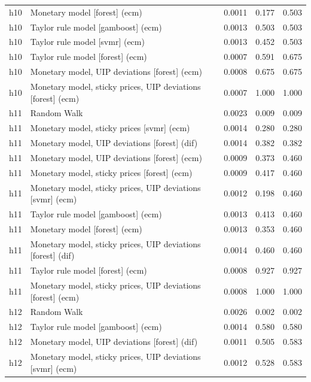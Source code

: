 \begin{ThreePartTable}
\begin{longtable}[t]{cp{5.5cm}ccc}
h10 & \raggedright Monetary model [forest] (ecm) & 0.0011 & 0.177 & 0.503\\
h10 & \raggedright Taylor rule model [gamboost] (ecm) & 0.0013 & 0.503 & 0.503\\
h10 & \raggedright Taylor rule model [svmr] (ecm) & 0.0013 & 0.452 & 0.503\\
h10 & \raggedright Taylor rule model [forest] (ecm) & 0.0007 & 0.591 & 0.675\\
h10 & \raggedright Monetary model, UIP deviations [forest] (ecm) & 0.0008 & 0.675 & 0.675\\
h10 & \raggedright Monetary model, sticky prices, UIP deviations [forest] (ecm) & 0.0007 & 1.000 & 1.000\\
\addlinespace
h11 & \raggedright Random Walk & 0.0023 & 0.009 & 0.009\\
h11 & \raggedright Monetary model, sticky prices [svmr] (ecm) & 0.0014 & 0.280 & 0.280\\
h11 & \raggedright Monetary model, UIP deviations [forest] (dif) & 0.0014 & 0.382 & 0.382\\
h11 & \raggedright Monetary model, UIP deviations [forest] (ecm) & 0.0009 & 0.373 & 0.460\\
h11 & \raggedright Monetary model, sticky prices [forest] (ecm) & 0.0009 & 0.417 & 0.460\\
h11 & \raggedright Monetary model, sticky prices, UIP deviations [svmr] (ecm) & 0.0012 & 0.198 & 0.460\\
h11 & \raggedright Taylor rule model [gamboost] (ecm) & 0.0013 & 0.413 & 0.460\\
h11 & \raggedright Monetary model [forest] (ecm) & 0.0013 & 0.353 & 0.460\\
h11 & \raggedright Monetary model, sticky prices, UIP deviations [forest] (dif) & 0.0014 & 0.460 & 0.460\\
h11 & \raggedright Taylor rule model [forest] (ecm) & 0.0008 & 0.927 & 0.927\\
h11 & \raggedright Monetary model, sticky prices, UIP deviations [forest] (ecm) & 0.0008 & 1.000 & 1.000\\
\addlinespace
h12 & \raggedright Random Walk & 0.0026 & 0.002 & 0.002\\
h12 & \raggedright Taylor rule model [gamboost] (ecm) & 0.0014 & 0.580 & 0.580\\
h12 & \raggedright Monetary model, UIP deviations [forest] (dif) & 0.0011 & 0.505 & 0.583\\
h12 & \raggedright Monetary model, sticky prices, UIP deviations [svmr] (ecm) & 0.0012 & 0.528 & 0.583\\

\end{longtable}
\end{ThreePartTable}
